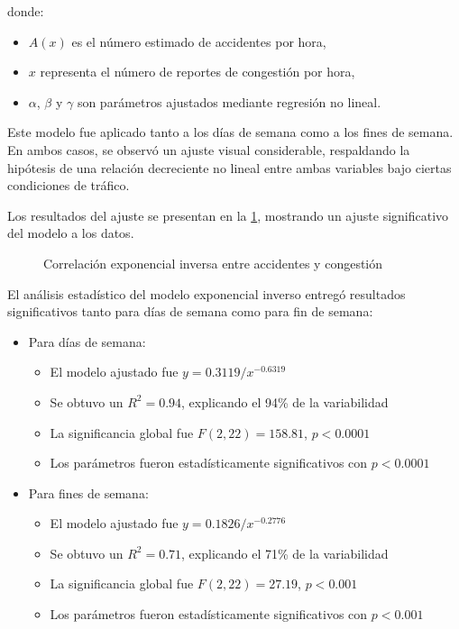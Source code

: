 \documentclass[12pt]{article}
\begin{document}
{donde:
\begin{itemize}
    \item $A(x)$ es el número estimado de accidentes por hora,
    \item $x$ representa el número de reportes de congestión por hora,
    \item $\alpha$, $\beta$ y $\gamma$ son parámetros ajustados mediante regresión no lineal.
\end{itemize}

Este modelo fue aplicado tanto a los días de semana como a los fines de semana. En ambos casos, se observó un ajuste visual considerable, respaldando la hipótesis de una relación decreciente no lineal entre ambas variables bajo ciertas condiciones de tráfico.

Los resultados del ajuste se presentan en la \cref{fig:corr_exp}, mostrando un ajuste significativo del modelo a los datos.

\begin{figure}[H]
    \centering
    \newline
    \newline
    \caption{Correlación exponencial inversa entre accidentes y congestión}
    \label{fig:corr_exp}
\end{figure}

El análisis estadístico del modelo exponencial inverso entregó resultados significativos tanto para días de semana como para fin de semana:

\begin{itemize}
    \item Para días de semana:
    \begin{itemize}
        \item El modelo ajustado fue $y = 0.3119/x^{-0.6319}$
        \item Se obtuvo un $R^2 = 0.94$, explicando el 94\% de la variabilidad
        \item La significancia global fue $F(2, 22) = 158.81$, $p < 0.0001$
        \item Los parámetros fueron estadísticamente significativos con $p < 0.0001$
    \end{itemize}

    \item Para fines de semana:
    \begin{itemize}
        \item El modelo ajustado fue $y = 0.1826/x^{-0.2776}$
        \item Se obtuvo un $R^2 = 0.71$, explicando el 71\% de la variabilidad
        \item La significancia global fue $F(2, 22) = 27.19$, $p < 0.001$
        \item Los parámetros fueron estadísticamente significativos con $p < 0.001$
    \end{itemize}
\end{itemize}

}
\end{document}
